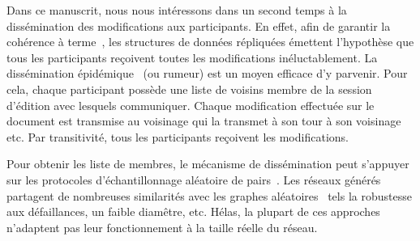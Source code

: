 Dans ce manuscrit, nous nous intéressons dans un second temps à la dissémination
des modifications aux participants. En effet, afin de garantir la cohérence à
terme~\cite{bailis2013eventual}, les structures de données répliquées émettent
l'hypothèse que tous les participants reçoivent toutes les modifications
inéluctablement. La dissémination épidémique~\cite{birman1999bimodal,
demers1987epidemic, eugster2003lightweight} (ou rumeur) est un moyen efficace
d'y parvenir. Pour cela, chaque participant possède une liste de voisins membre
de la session d'édition avec lesquels communiquer. Chaque modification effectuée
sur le document est transmise au voisinage qui la transmet à son tour à son
voisinage etc. Par transitivité, tous les participants reçoivent les
modifications.

Pour obtenir les liste de membres, le mécanisme de dissémination peut s'appuyer
sur les protocoles d'échantillonnage aléatoire de
pairs~\cite{eugster2003lightweight, ganesh2001scamp, jelasity2007gossip,
tolgyeski2009adaptive, voulgaris2005cyclon}. Les réseaux générés partagent de
nombreuses similarités avec les graphes aléatoires~\cite{erdos1959random} tels
la robustesse aux défaillances, un faible diamêtre, etc. Hélas, la plupart de
ces approches n'adaptent pas leur fonctionnement à la taille réelle du réseau.



